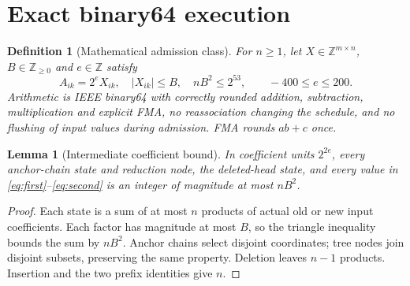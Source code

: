 \documentclass[10pt,a4paper]{article}
\newtheorem{lemma}[theorem]{Lemma}
\newtheorem{definition}[theorem]{Definition}
\newcommand{\Z}{\mathbb Z}
\newcommand{\abs}[1]{\lvert#1\rvert}
\begin{document}
\section{Exact binary64 execution}
\begin{definition}[Mathematical admission class]\label{def:class}
For $n\ge1$, let $X\in\Z^{m\times n}$, $B\in\Z_{\ge0}$ and $e\in\Z$ satisfy
\begin{equation}\label{eq:admission}
 A_{ik}=2^eX_{ik},\quad \abs{X_{ik}}\le B,\quad nB^2\le2^{53},
 \qquad -400\le e\le200.
\end{equation}
Arithmetic is IEEE binary64 with correctly rounded addition, subtraction,
multiplication and explicit FMA, no reassociation changing the schedule, and
no flushing of input values during admission. FMA rounds $ab+c$ once.
\end{definition}

\begin{lemma}[Intermediate coefficient bound]\label{lem:bound}
In coefficient units $2^{2e}$, every anchor-chain state and reduction node,
the deleted-head state, and every value in \eqref{eq:first}--\eqref{eq:second}
is an integer of magnitude at most $nB^2$.
\end{lemma}
\begin{proof}
Each state is a sum of at most $n$ products of actual old or new input
coefficients. Each factor has magnitude at most $B$, so the triangle
inequality bounds the sum by $nB^2$. Anchor chains select disjoint coordinates;
tree nodes join disjoint subsets, preserving the same property. Deletion
leaves $n-1$ products. Insertion and the two prefix identities give $n$.
\end{proof}
\end{document}
